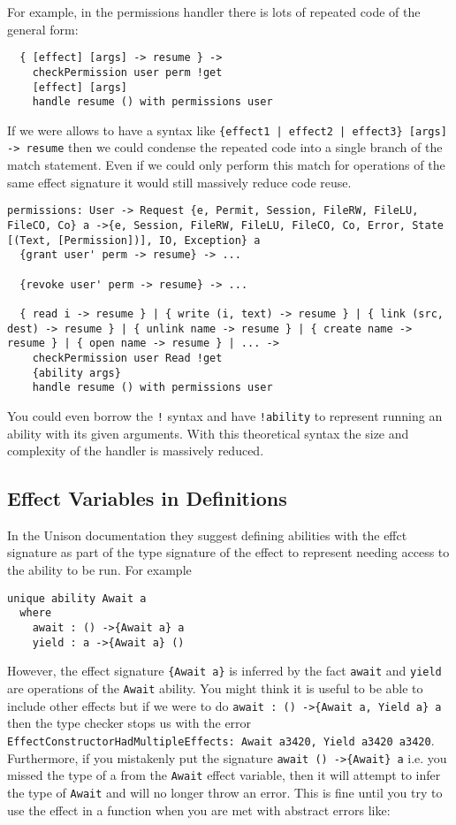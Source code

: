 \documentclass[logo,bsc,singlespacing,parskip]{infthesis}
\begin{document}
For example, in the permissions handler there is lots of repeated code of the general form:

\begin{lstlisting}
  { [effect] [args] -> resume } -> 
    checkPermission user perm !get
    [effect] [args]
    handle resume () with permissions user
\end{lstlisting}

If we were allows to have a syntax like \texttt{\{effect1 | effect2 | effect3\}
[args] -> resume} then we could condense the repeated code into a single branch
of the match statement. Even if we could only perform this match for operations
of the same effect signature it would still massively reduce code reuse.

\begin{lstlisting}[language=unison]
permissions: User -> Request {e, Permit, Session, FileRW, FileLU, FileCO, Co} a ->{e, Session, FileRW, FileLU, FileCO, Co, Error, State [(Text, [Permission])], IO, Exception} a
  {grant user' perm -> resume} -> ...

  {revoke user' perm -> resume} -> ...

  { read i -> resume } | { write (i, text) -> resume } | { link (src, dest) -> resume } | { unlink name -> resume } | { create name -> resume } | { open name -> resume } | ... -> 
    checkPermission user Read !get
    {ability args}
    handle resume () with permissions user
\end{lstlisting}

You could even borrow the \texttt{!} syntax and have \texttt{!ability} to represent running an ability with its given arguments.
With this theoretical syntax the size and complexity of the handler is massively reduced.

\subsection{Effect Variables in Definitions}

In the Unison documentation \cite{unison-abilities} they suggest defining
abilities with the effct signature as part of the type signature of the effect
to represent needing access to the ability to be run. For example

\begin{lstlisting}[language=unison]
unique ability Await a
  where
    await : () ->{Await a} a
    yield : a ->{Await a} ()
\end{lstlisting}

However, the effect signature \texttt{\{Await a\}} is inferred by the fact
\texttt{await} and \texttt{yield} are operations of the \texttt{Await} ability.
You might think it is useful to be able to include other effects but if we were
to do \texttt{await : () ->\{Await a, Yield a\} a} then the type checker stops
us with the error \texttt{  EffectConstructorHadMultipleEffects: {Await a3420,
Yield a3420} a3420}. Furthermore, if you mistakenly put the signature
\texttt{await () ->\{Await\} a} i.e. you missed the type of a from the
\texttt{Await} effect variable, then it will attempt to infer the type of
\texttt{Await} and will no longer throw an error. This is fine until you try to use the effect in a function when you are met with abstract errors like: 
\end{document}

